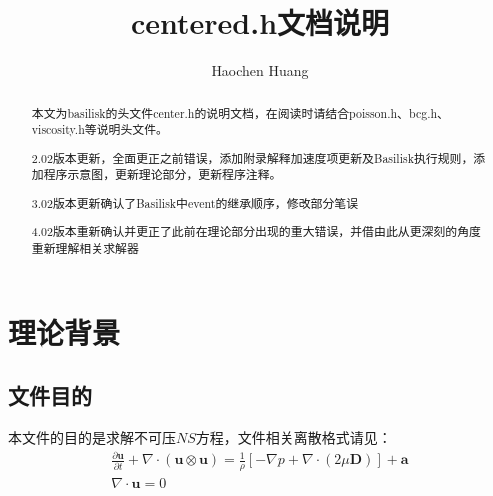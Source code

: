 \documentclass[lang=cn,11pt,a4paper]{elegantpaper}
\title{centered.h文档说明}
\author{Haochen Huang}
\date{\zhtoday}
\begin{document}
\maketitle
\tableofcontents

\begin{abstract}
本文为basilisk的头文件center.h的说明文档，在阅读时请结合poisson.h、bcg.h、viscosity.h等说明头文件。\par
2.02版本更新，全面更正之前错误，添加附录解释加速度项更新及Basilisk执行规则，添加程序示意图，更新理论部分，更新程序注释。\par
3.02版本更新确认了Basilisk中event的继承顺序，修改部分笔误\par
4.02版本重新确认并更正了此前在理论部分出现的重大错误，并借由此从更深刻的角度重新理解相关求解器

\end{abstract}


\section{理论背景}

\subsection{文件目的}
本文件的目的是求解不可压$NS$方程，文件相关离散格式请见\cite{popinet2003gerris}\cite{popinet_accurate_2009}：
\begin{gather}\label{equ:bukeyans}
    \frac{\partial \mathbf{u}}{\partial t}+\nabla\cdot(\mathbf{u}\otimes\mathbf{u})= \frac{1}{\rho}[-\nabla p+\nabla\cdot(2\mu\mathbf{D})]+\mathbf{a}\\
    \nabla \cdot\mathbf{u} = 0
\end{gather}
\end{document}
